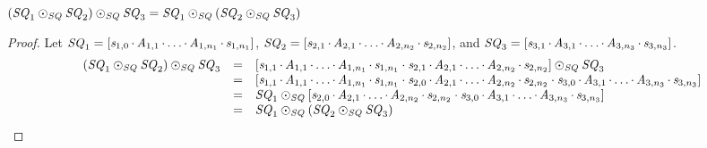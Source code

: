 \documentclass[acmsmall]{acmart}
\begin{document}
\begin{lemma}
  \label{lem:sequence-concat-assoc}
  $(\mathit{SQ}_1 \odot_{\mathit{SQ}} \mathit{SQ}_2) \odot_{\mathit{SQ}} \mathit{SQ}_3 =
  \mathit{SQ}_1 \odot_{\mathit{SQ}} (\mathit{SQ}_2 \odot_{\mathit{SQ}} \mathit{SQ}_3)$
\end{lemma}
\begin{proof}
  Let $\mathit{SQ}_1 =
  [\mathit{s}_{1,0} \mkern-1mu\cdot\mkern-1mu \mathit{A}_{1,1} \mkern-1mu\cdot\mkern-1mu \ldots \mkern-1mu\cdot\mkern-1mu \mathit{A}_{1,n_1} \mkern-1mu\cdot\mkern-1mu \mathit{s}_{1,n_1}]$,
  $\mathit{SQ}_2 =
  [\mathit{s}_{2,1} \mkern-1mu\cdot\mkern-1mu \mathit{A}_{2,1} \mkern-1mu\cdot\mkern-1mu \ldots \mkern-1mu\cdot\mkern-1mu \mathit{A}_{2,n_2} \mkern-1mu\cdot\mkern-1mu \mathit{s}_{2,n_2}]$,
  and $\mathit{SQ}_3 =
  [\mathit{s}_{3,1} \mkern-1mu\cdot\mkern-1mu \mathit{A}_{3,1} \mkern-1mu\cdot\mkern-1mu \ldots \mkern-1mu\cdot\mkern-1mu \mathit{A}_{3,n_3} \mkern-1mu\cdot\mkern-1mu \mathit{s}_{3,n_3}]$.
  \[
    \begin{array}{rcl}
      (\Sequence_1 \ConcatSequence \Sequence_2) \ConcatSequence \Sequence_3
      & = & \SequenceOf{\String_{1,1} \SeqSep \Atom_{1,1} \SeqSep \ldots \SeqSep \Atom_{1,n_1} \SeqSep 
            \String_{1,n_1}\Concat\String_{2,1} \SeqSep 
            \Atom_{2,1} \SeqSep \ldots \SeqSep \Atom_{2,n_2} \SeqSep \String_{2,n_2}}
            \ConcatSequence \Sequence_3\\
      & = & \SequenceOf{\String_{1,1} \SeqSep \Atom_{1,1} \SeqSep \ldots \SeqSep \Atom_{1,n_1} \SeqSep 
            \String_{1,n_1}\Concat\String_{2,0} \SeqSep 
            \Atom_{2,1} \SeqSep \ldots \SeqSep \Atom_{2,n_2} \SeqSep 
            \String_{2,n_2}\Concat\String_{3,0} \SeqSep 
            \Atom_{3,1} \SeqSep \ldots \SeqSep \Atom_{3,n_3} \SeqSep \String_{3,n_3}}\\
      & = & \Sequence_1 \ConcatSequence
            \SequenceOf{\String_{2,0} \SeqSep 
            \Atom_{2,1} \SeqSep \ldots \SeqSep \Atom_{2,n_2} \SeqSep 
            \String_{2,n_2}\Concat\String_{3,0} \SeqSep 
            \Atom_{3,1} \SeqSep \ldots \SeqSep \Atom_{3,n_3} \SeqSep \String_{3,n_3}}\\
      & = & \Sequence_1 \ConcatSequence (\Sequence_2 \ConcatSequence \Sequence_3)
    \end{array}
  \]
\end{proof}
\end{document}
